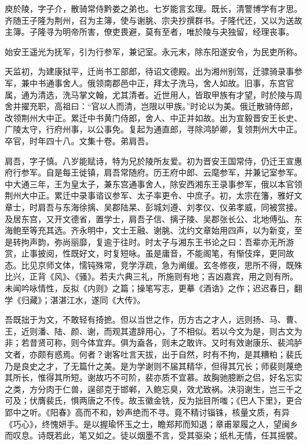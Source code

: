 \documentclass[12pt,UTF8]{ctexbook}
\begin{document}
庾於陵，字子介，散骑常侍黔娄之弟也。七岁能言玄理。既长，清警博学有才思。齐随王子隆为荆州，召为主簿，使与谢朓、宗夬抄撰群书。子隆代还，又以为送故主簿。子隆寻为明帝所害，僚吏畏避，莫有至者，唯於陵与夬独留，经理丧事。

始安王遥光为抚军，引为行参军，兼记室。永元末，除东阳遂安令，为民吏所称。

天监初，为建康狱平，迁尚书工部郎，待诏文德殿。出为湘州别驾，迁骠骑录事参军，兼中书通事舍人。俄领南郡邑中正，拜太子洗马，舍人如故。旧事，东宫官属，通为清选，洗马掌文翰，尤其清者。近世用人，皆取甲族有才望，时於陵与周舍并擢充职，高祖曰：“官以人而清，岂限以甲族。”时论以为美。俄迁散骑侍郎，改领荆州大中正。累迁中书黄门侍郎，舍人、中正并如故。出为宣毅晋安王长史、广陵太守，行府州事，以公事免。复起为通直郎，寻除鸿胪卿，复领荆州大中正。卒官，时年四十八。文集十卷。弟肩吾。

肩吾，字子慎。八岁能赋诗，特为兄於陵所友爱。初为晋安王国常侍，仍迁王宣惠府行参军。自是每王徙镇，肩吾常随府。历王府中郎、云麾参军，并兼记室参军。中大通三年，王为皇太子，兼东宫通事舍人，除安西湘东王录事参军，俄以本官领荆州大中正。累迁中录事谘议参军、太子率更令、中庶子。初，太宗在籓，雅好文章士，时肩吾与东海徐摛、吴郡陆杲、彭城刘遵、刘孝仪、仪弟孝威，同被赏接。及居东宫，又开文德省，置学士，肩吾子信、摛子陵、吴郡张长公、北地傅弘、东海鲍至等充其选。齐永明中，文士王融、谢朓、沈约文章始用四声，以为新变，至是转拘声韵，弥尚丽靡，复逾于往时。时太子与湘东王书论之曰：吾辈亦无所游赏，止事披阅，性既好文，时复短咏。虽是庸音，不能阁笔，有惭伎痒，更同故态。比见京师文体，懦钝殊常，竞学浮疏，急为阐缓。玄冬修夜，思所不得，既殊比兴，正背《风》、《骚》。若夫六典三礼，所施则有地；吉凶嘉宾，用之则有所。未闻吟咏情性，反拟《内则》之篇；操笔写志，更摹《酒诰》之作；迟迟春日，翻学《归藏》；湛湛江水，遂同《大传》。

吾既拙于为文，不敢轻有掎摭。但以当世之作，历方古之才人，远则扬、马、曹、王，近则潘、陆、颜、谢，而观其遣辞用心，了不相似。若以今文为是，则古文为非；若昔贤可称，则今体宜弃。俱为盍各，则未之敢许。又时有效谢康乐、裴鸿胪文者，亦颇有惑焉。何者？谢客吐言天拔，出于自然，时有不拘，是其糟粕；裴氏乃是良史之才，了无篇什之美。是为学谢则不届其精华，但得其冗长；师裴则蔑绝其所长，惟得其所短。谢故巧不可阶，裴亦质不宜慕。故胸驰臆断之侣，好名忘实之类，方分肉于仁兽，逞郤克于邯郸，入鲍忘臭，效尤致祸。决羽谢生，岂三千之可及；伏膺裴氏，惧两唐之不传。故玉徽金铣，反为拙目所嗤；《巴人下里》，更合郢中之听。《阳春》高而不和，妙声绝而不寻。竟不精讨锱铢，核量文质，有异《巧心》，终愧妍手。是以握瑜怀玉之士，瞻郑邦而知退；章甫翠履之人，望闽乡而叹息。诗既若此，笔又如之。徒以烟墨不言，受其驱染；纸札无情，任其摇襞。
\end{document}
